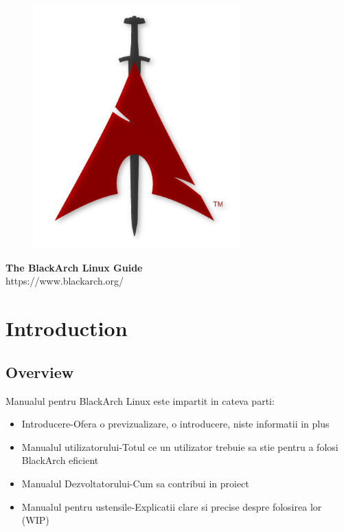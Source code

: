 \documentclass[a4paper, oneside, 11pt]{book}
\begin{document}
\pagestyle{empty}
\begin{center}
\begin{figure}[htbp]
\centering
\vspace{0.5cm}
\includegraphics[width=8cm]{images/logo.png}
\label{fig:logo}
\end{figure}
\vspace{0.5cm}
\Huge{\textbf{The BlackArch Linux Guide}}\\
\vspace{1cm}
\Large{\color{red}https://www.blackarch.org/}\\
\vspace{0.5cm}
\end{center}
\newpage
\tableofcontents
\newpage
\pagestyle{fancy}


\chapter{Introduction}

\section{Overview}
Manualul pentru BlackArch Linux este impartit in cateva parti:
\begin{itemize}
\item Introducere-Ofera o previzualizare, o introducere, niste informatii in plus
\item Manualul utilizatorului-Totul ce un utilizator trebuie sa stie pentru a folosi BlackArch eficient
\item Manualul Dezvoltatorului-Cum sa contribui in proiect
\item Manualul pentru ustensile-Explicatii clare si precise despre folosirea lor (WIP)
\end{itemize}
\end{document}
